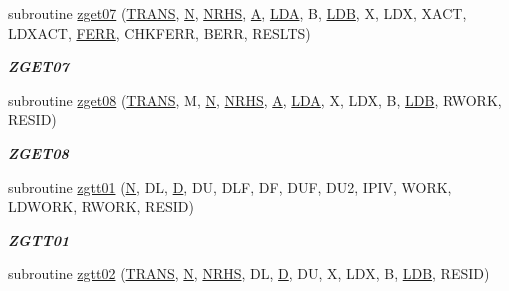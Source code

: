 \begin{DoxyCompactItemize}
subroutine \hyperlink{group__complex16__lin_gad5156206ee08b242659e67299f280117}{zget07} (\hyperlink{superlu__enum__consts_8h_a0c4e17b2d5cea33f9991ccc6a6678d62a1f61e3015bfe0f0c2c3fda4c5a0cdf58}{T\+R\+A\+N\+S}, \hyperlink{polmisc_8c_a0240ac851181b84ac374872dc5434ee4}{N}, \hyperlink{example__user_8c_aa0138da002ce2a90360df2f521eb3198}{N\+R\+H\+S}, \hyperlink{classA}{A}, \hyperlink{example__user_8c_ae946da542ce0db94dced19b2ecefd1aa}{L\+D\+A}, B, \hyperlink{example__user_8c_a50e90a7104df172b5a89a06c47fcca04}{L\+D\+B}, X, L\+D\+X, X\+A\+C\+T, L\+D\+X\+A\+C\+T, \hyperlink{superlu__enum__consts_8h_af00a42ecad444bbda75cde1b64bd7e72a78fd14d7abebae04095cfbe02928f153}{F\+E\+R\+R}, C\+H\+K\+F\+E\+R\+R, B\+E\+R\+R, R\+E\+S\+L\+T\+S)
\begin{DoxyCompactList}\small\item\em {\bfseries Z\+G\+E\+T07} \end{DoxyCompactList}\item 
subroutine \hyperlink{group__complex16__lin_ga53e3ebc0f47d199b12a87fb375f56a19}{zget08} (\hyperlink{superlu__enum__consts_8h_a0c4e17b2d5cea33f9991ccc6a6678d62a1f61e3015bfe0f0c2c3fda4c5a0cdf58}{T\+R\+A\+N\+S}, M, \hyperlink{polmisc_8c_a0240ac851181b84ac374872dc5434ee4}{N}, \hyperlink{example__user_8c_aa0138da002ce2a90360df2f521eb3198}{N\+R\+H\+S}, \hyperlink{classA}{A}, \hyperlink{example__user_8c_ae946da542ce0db94dced19b2ecefd1aa}{L\+D\+A}, X, L\+D\+X, B, \hyperlink{example__user_8c_a50e90a7104df172b5a89a06c47fcca04}{L\+D\+B}, R\+W\+O\+R\+K, R\+E\+S\+I\+D)
\begin{DoxyCompactList}\small\item\em {\bfseries Z\+G\+E\+T08} \end{DoxyCompactList}\item 
subroutine \hyperlink{group__complex16__lin_ga78faf5e08e43bd0412f026561940c781}{zgtt01} (\hyperlink{polmisc_8c_a0240ac851181b84ac374872dc5434ee4}{N}, D\+L, \hyperlink{odrpack_8h_a7dae6ea403d00f3687f24a874e67d139}{D}, D\+U, D\+L\+F, D\+F, D\+U\+F, D\+U2, I\+P\+I\+V, W\+O\+R\+K, L\+D\+W\+O\+R\+K, R\+W\+O\+R\+K, R\+E\+S\+I\+D)
\begin{DoxyCompactList}\small\item\em {\bfseries Z\+G\+T\+T01} \end{DoxyCompactList}\item 
subroutine \hyperlink{group__complex16__lin_ga2b99c378f9e7154cb6e6bd496d3b1431}{zgtt02} (\hyperlink{superlu__enum__consts_8h_a0c4e17b2d5cea33f9991ccc6a6678d62a1f61e3015bfe0f0c2c3fda4c5a0cdf58}{T\+R\+A\+N\+S}, \hyperlink{polmisc_8c_a0240ac851181b84ac374872dc5434ee4}{N}, \hyperlink{example__user_8c_aa0138da002ce2a90360df2f521eb3198}{N\+R\+H\+S}, D\+L, \hyperlink{odrpack_8h_a7dae6ea403d00f3687f24a874e67d139}{D}, D\+U, X, L\+D\+X, B, \hyperlink{example__user_8c_a50e90a7104df172b5a89a06c47fcca04}{L\+D\+B}, R\+E\+S\+I\+D)

\end{DoxyCompactItemize}
